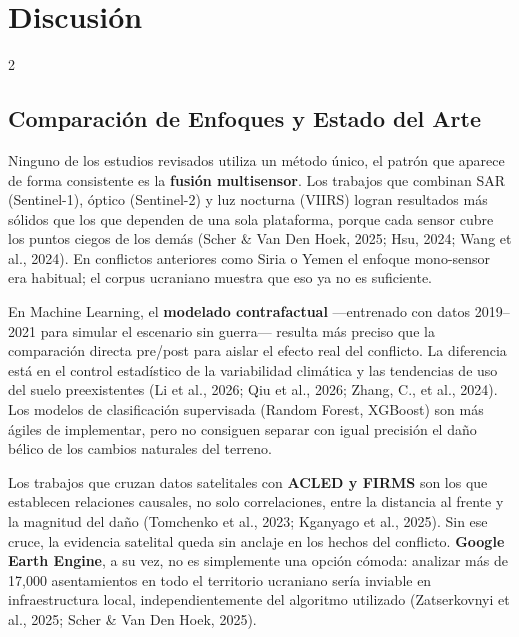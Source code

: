 \documentclass[12pt, a4paper]{article}
\begin{document}
\section{Discusión}

\begin{multicols}{2}

\subsection{Comparación de Enfoques y Estado del Arte}

Ninguno de los estudios revisados utiliza un método único, el patrón que aparece de forma consistente es la \textbf{fusión multisensor}. Los trabajos que combinan SAR (Sentinel-1), óptico (Sentinel-2) y luz nocturna (VIIRS) logran resultados más sólidos que los que dependen de una sola plataforma, porque cada sensor cubre los puntos ciegos de los demás (Scher \& Van Den Hoek, 2025; Hsu, 2024; Wang et al., 2024). En conflictos anteriores como Siria o Yemen el enfoque mono-sensor era habitual; el corpus ucraniano muestra que eso ya no es suficiente.

En Machine Learning, el \textbf{modelado contrafactual} —entrenado con datos 2019--2021 para simular el escenario sin guerra— resulta más preciso que la comparación directa pre/post para aislar el efecto real del conflicto. La diferencia está en el control estadístico de la variabilidad climática y las tendencias de uso del suelo preexistentes (Li et al., 2026; Qiu et al., 2026; Zhang, C., et al., 2024). Los modelos de clasificación supervisada (Random Forest, XGBoost) son más ágiles de implementar, pero no consiguen separar con igual precisión el daño bélico de los cambios naturales del terreno.

Los trabajos que cruzan datos satelitales con \textbf{ACLED y FIRMS} son los que establecen relaciones causales, no solo correlaciones, entre la distancia al frente y la magnitud del daño (Tomchenko et al., 2023; Kganyago et al., 2025). Sin ese cruce, la evidencia satelital queda sin anclaje en los hechos del conflicto. \textbf{Google Earth Engine}, a su vez, no es simplemente una opción cómoda: analizar más de 17,000 asentamientos en todo el territorio ucraniano sería inviable en infraestructura local, independientemente del algoritmo utilizado (Zatserkovnyi et al., 2025; Scher \& Van Den Hoek, 2025).


\end{multicols}
\end{document}
